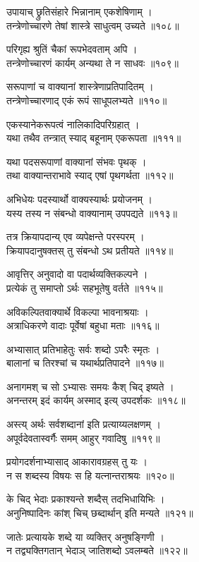 उपायाच् छ्रुतिसंहारे भिन्नानाम् एकशेषिणाम् ।\\तन्त्रेणोच्चारणे तेषां शास्त्रे साधुत्वम् उच्यते ॥१०८॥

परिगृह्य श्रुतिं चैकां रूपभेदवताम् अपि ।\\तन्त्रेणोच्चारणं कार्यम् अन्यथा ते न साधवः ॥१०९॥

सरूपाणां च वाक्यानां शास्त्रेणाप्रतिपादितम् ।\\तन्त्रेणोच्चारणाद् एकं रूपं साधूपलभ्यते ॥११०॥

एकस्यानेकरूपत्वं नालिकादिपरिग्रहात् ।\\यथा तथैव तन्त्रात् स्याद् बहूनाम् एकरूपता ॥१११॥

यथा पदसरूपाणां वाक्यानां संभवः पृथक् ।\\तथा वाक्यान्तराभावे स्याद् एषां पृथगर्थता ॥११२॥

अभिधेयः पदस्यार्थो वाक्यस्यार्थः प्रयोजनम् ।\\यस्य तस्य न संबन्धो वाक्यानाम् उपपद्यते ॥११३॥

तत्र क्रियापदान्य् एव व्यपेक्षन्ते परस्परम् ।\\क्रियापदानुषक्तस् तु संबन्धो ऽथ प्रतीयते ॥११४॥

आवृत्तिर् अनुवादो वा पदार्थव्यक्तिकल्पने ।\\प्रत्येकं तु समाप्तो ऽर्थः सहभूतेषु वर्तते ॥११५॥

अविकल्पितवाक्यार्थे विकल्पा भावनाश्रयाः ।\\अत्राधिकरणे वादाः पूर्वेषां बहुधा मताः ॥११६॥

अभ्यासात् प्रतिभाहेतुः सर्वः शब्दो ऽपरैः स्मृतः ।\\बालानां च तिरश्चां च यथार्थप्रतिपादने ॥११७॥

अनागमश् च सो ऽभ्यासः समयः कैश् चिद् इष्यते ।\\अनन्तरम् इदं कार्यम् अस्माद् इत्य् उपदर्शकः ॥११८॥

अस्त्य् अर्थः सर्वशब्दानां इति प्रत्याय्यलक्षणम् ।\\अपूर्वदेवतास्वर्गैः समम् आहुर् गवादिषु ॥११९॥

प्रयोगदर्शनाभ्यासाद् आकारावग्रहस् तु यः ।\\न स शब्दस्य विषयः स हि यत्नान्तराश्रयः ॥१२०॥

के चिद् भेदाः प्रकाश्यन्ते शब्दैस् तदभिधायिभिः ।\\अनुनिष्पादिनः कांश् चिच् छब्दार्थान् इति मन्यते ॥१२१॥

जातेः प्रत्यायके शब्दे या व्यक्तिर् अनुषङ्गिणी ।\\न तद्व्यक्तिगतान् भेदाञ् जातिशब्दो ऽवलम्बते ॥१२२॥

